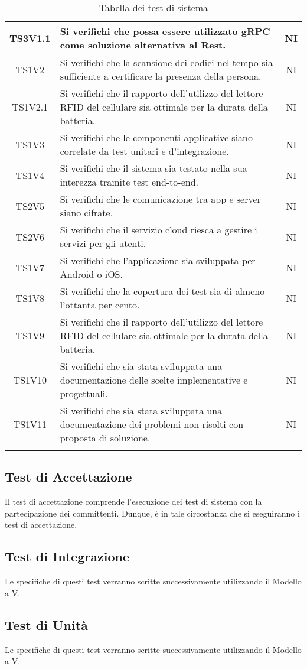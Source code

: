 \begin{center}
\begin{longtable}{|c|p{10cm}|c|}
			\hline
			TS3V1.1 & Si verifichi che possa essere utilizzato gRPC come soluzione alternativa al Rest. & NI \\	
			\hline
			TS1V2 & Si verifichi che la scansione dei codici nel tempo sia sufficiente a certificare la presenza della persona. & NI \\	
			\hline
			TS1V2.1 & Si verifichi che il rapporto dell'utilizzo del lettore RFID del cellulare sia ottimale per la durata della batteria. & NI \\	
			\hline
			TS1V3 & Si verifichi che le componenti applicative siano correlate da test unitari e d'integrazione. & NI \\	
			\hline
			TS1V4 & Si verifichi che il sistema sia testato nella sua interezza tramite test end-to-end. & NI \\	
			\hline
			TS2V5 & Si verifichi che le comunicazione tra app e server siano cifrate. & NI \\	
			\hline
			TS2V6 & Si verifichi che il servizio cloud riesca a gestire i servizi per gli utenti. & NI \\	
			\hline
			TS1V7 & Si verifichi che l'applicazione sia sviluppata per Android o iOS. & NI \\	
			\hline
			TS1V8 & Si verifichi che la copertura dei test  sia di almeno l'ottanta per cento. & NI \\	
			\hline
			TS1V9 & Si verifichi che il rapporto dell'utilizzo del lettore RFID del cellulare sia ottimale per la durata della batteria. & NI \\	
			\hline
			TS1V10 & Si verifichi che sia stata sviluppata una documentazione delle scelte implementative e progettuali. & NI \\	
			\hline
			TS1V11 & Si verifichi che sia stata sviluppata una documentazione dei problemi non risolti con proposta di soluzione. & NI \\	
			\hline
			\hiderowcolors
			\caption{Tabella dei test di sistema}		
		\end{longtable}	
	\end{center}

	\subsection{Test di Accettazione}
	Il test di accettazione comprende l'esecuzione dei test di sistema con la partecipazione dei committenti. Dunque, è in tale circostanza che si eseguiranno i test di accettazione. 
	\subsection{Test di Integrazione}
	Le specifiche di questi test verranno scritte successivamente utilizzando il Modello a V.
	\subsection{Test di Unità}
	Le specifiche di questi test verranno scritte successivamente utilizzando il Modello a V.

